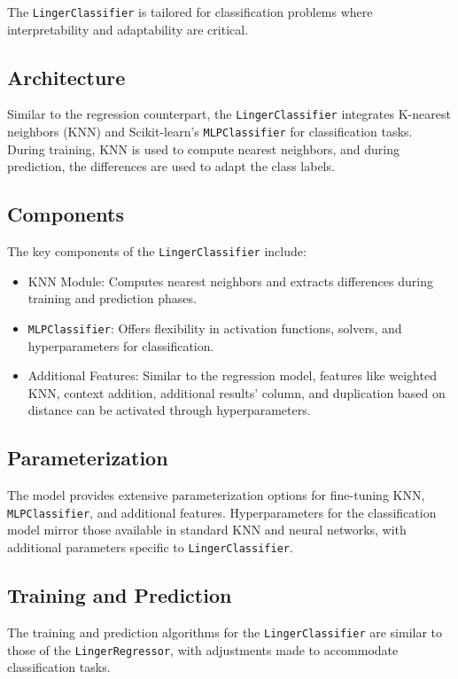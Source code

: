 \documentclass[a4paper, 12pt]{report}
\begin{document}
The \texttt{LingerClassifier} is tailored for classification problems where interpretability and adaptability are critical.

\subsection{Architecture}
Similar to the regression counterpart, the \texttt{LingerClassifier} integrates K-nearest neighbors (KNN) and Scikit-learn's \texttt{MLPClassifier} for classification tasks. 
During training, KNN is used to compute nearest neighbors, and during prediction, the differences are used to adapt the class labels.

\subsection{Components}
The key components of the \texttt{LingerClassifier} include:
\begin{itemize}
    \item KNN Module: Computes nearest neighbors and extracts differences during training and prediction phases.
    \item \texttt{MLPClassifier}: Offers flexibility in activation functions, solvers, and hyperparameters for classification.
    \item Additional Features: Similar to the regression model, features like weighted KNN, context addition, additional results' column, and duplication based on distance can be activated through hyperparameters.
\end{itemize}

\subsection{Parameterization}
The model provides extensive parameterization options for fine-tuning KNN, \texttt{MLPClassifier}, and additional features. 
Hyperparameters for the classification model mirror those available in standard KNN and neural networks, with additional parameters specific to \texttt{LingerClassifier}.

\subsection{Training and Prediction}
The training and prediction algorithms for the \texttt{LingerClassifier} are similar to those of the \texttt{LingerRegressor}, with adjustments made to accommodate classification tasks.
\end{document}
